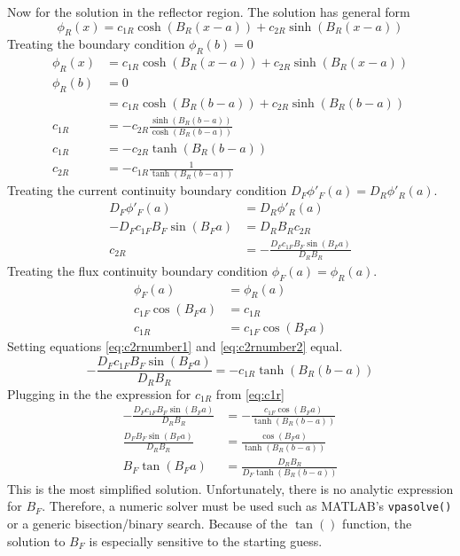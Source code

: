   Now for the solution in the reflector region. The solution has general form
  \begin{equation}
    \phi_R(x) = c_{1R} \cosh(B_R (x-a)) + c_{2R} \sinh(B_R (x-a))
  \end{equation}
  Treating the boundary condition $\phi_R(b)=0$
  \begin{align}
    \phi_R(x) &= c_{1R} \cosh(B_R (x-a)) + c_{2R} \sinh(B_R (x-a))\\
    \phi_R(b) &= 0 \\
    &= c_{1R} \cosh(B_R(b-a)) + c_{2R} \sinh(B_R(b-a))\\
    c_{1R} &= -c_{2R} \frac{\sinh(B_R(b-a))}{\cosh(B_R(b-a))}\\
    c_{1R} &= -c_{2R} \tanh(B_R(b-a))\\
    c_{2R} &= -c_{1R} \frac{1}{\tanh(B_R(b-a))} \label{eq:c2rnumber1}
  \end{align}
  Treating the current continuity boundary condition
  $D_F \phi'_F(a) = D_R \phi'_R(a)$.
  \begin{align}
    D_F \phi'_F(a) &= D_R \phi'_R(a) \\
    -D_F c_{1F} B_F \sin(B_F a) &= D_R B_R c_{2R} \\
    c_{2R} &= -\frac{D_F c_{1F} B_F \sin(B_F a)}{D_R B_R} \label{eq:c2rnumber2}
  \end{align}
  Treating the flux continuity boundary condition $\phi_F(a)=\phi_R(a)$.
  \begin{align}
    \phi_F(a)&=\phi_R(a) \\
    c_{1F} \cos(B_F a) &= c_{1R} \\
    c_{1R} &= c_{1F} \cos(B_F a) \label{eq:c1r}
  \end{align}
  Setting equations \eqref{eq:c2rnumber1} and \eqref{eq:c2rnumber2} equal.
  \begin{equation}
    - \frac{D_F c_{1F} B_F \sin(B_F a)}{D_R B_R} = -c_{1R} \tanh(B_R(b-a))
  \end{equation}
  Plugging in the the expression for $c_{1R}$ from \eqref{eq:c1r}
  \begin{align}
    - \frac{D_F c_{1F} B_F \sin(B_F a)}{D_R B_R} &=
      - \frac{c_{1F} \cos(B_F a)}{\tanh(B_R(b-a))}\\
    \frac{D_F B_F \sin(B_F a)}{D_R B_R} &= 
      \frac{\cos(B_F a)}{\tanh(B_R(b-a))} \\
    B_F \tan(B_F a) &= \frac{D_R B_R}{D_F \tanh(B_R(b-a))}
  \end{align}
  This is the most simplified solution. Unfortunately, there is no analytic
  expression for $B_F$. Therefore, a numeric solver must be used such as 
  MATLAB's \verb|vpasolve()| or a generic bisection/binary search. Because of
  the $\tan()$ function, the solution to $B_F$ is especially sensitive to the
  starting guess.
  
